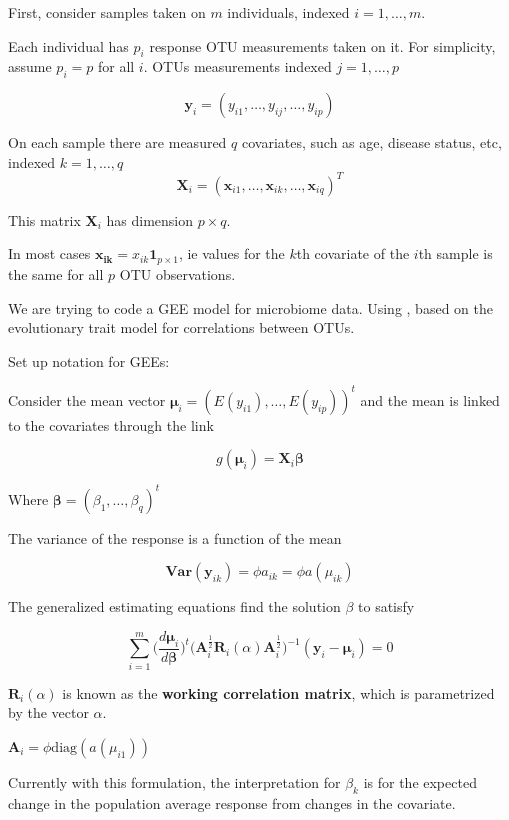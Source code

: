 \documentclass[10pt]{article}
\begin{document}
First, consider samples taken on $m$ individuals, indexed $i = 1, \ldots , m$.


Each individual has $p_i$ response OTU measurements taken on it. For simplicity, assume $p_i = p$ for all $i$. OTUs measurements indexed $j = 1, \ldots , p $

$$\mathbf{y}_i = (y_{i1}, \ldots, y_{ij}, \ldots , y_{ip})$$




On each sample there are measured $q$ covariates, such as age, disease status, etc, indexed $k = 1, \ldots, q$
$$\mathbf{X}_i = (\mathbf{x}_{i1}, \ldots, \mathbf{x}_{ik}, \ldots , \mathbf{x}_{iq})^T$$

This matrix $\mathbf{X}_i$ has dimension $p \times q$.

In most cases $\mathbf{x_{ik}} = x_{ik}\boldsymbol{1}_{p \times 1}$, ie values for the $k$th covariate of the $i$th sample is the same for all $p$ OTU observations.


We are trying to code a GEE model for microbiome data. Using \cite{Xiao2018}, based on the evolutionary trait model for correlations between OTUs.


Set up notation for GEEs:

Consider the mean vector $\boldsymbol\mu_i = (E(y_{i1}), \ldots , E(y_{ip}))^t$ and the mean is linked to the covariates through the link

$$g(\boldsymbol\mu_i ) = \mathbf{X}_i \boldsymbol\beta$$

Where $\boldsymbol\beta = (\beta_1 , \ldots , \beta_q)^t$

The variance of the response is a function of the mean

$$\textbf{Var}(\mathbf{y}_{ik}) = \phi a_{ik} = \phi a(\mu_{ik})$$


The generalized estimating equations find the solution $\beta $ to satisfy

$$\sum_{i = 1}^m \bigg(\frac{d \boldsymbol\mu_i}{d \boldsymbol\beta}\bigg)^t \bigg(\mathbf{A}_i^{\frac{1}{2}} \mathbf{R}_i(\alpha) \mathbf{A}_i^{\frac{1}{2}}\bigg)^{-1}(\mathbf{y}_i - \boldsymbol\mu_i) = 0$$


$\mathbf{R}_i(\alpha)$ is known as the \textbf{working correlation matrix}, which is parametrized by the vector $\alpha$.

$\mathbf{A}_i = \phi\text{diag}(a(\mu_{i1}))$


Currently with this formulation, the interpretation for $\beta_k$ is for the expected change in the population average response from changes in the covariate.
\end{document}
